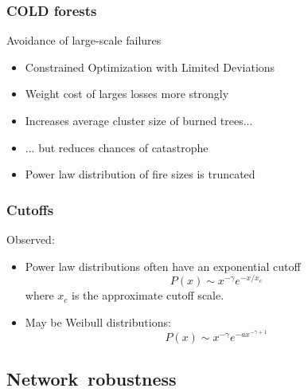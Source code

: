 \begin{frame}
  \frametitle{COLD forests}

  \begin{block}{Avoidance of large-scale failures}
      \begin{itemize}
      \item<1-> Constrained Optimization with Limited Deviations\cite{newman2002f}
      \item<2-> Weight cost of larges losses more strongly
      \item<3-> Increases average cluster size of burned trees...
      \item<4-> ... but reduces chances of catastrophe
      \item<5-> Power law distribution of fire sizes is truncated
      \end{itemize}
  \end{block}
  
\end{frame}


\begin{frame}
  \frametitle{Cutoffs}

  \begin{block}{Observed:}
    \begin{itemize}
    \item<1->
      Power law distributions often have an exponential cutoff
      $$ 
      P(x) \sim x^{-\gamma} e^{-x/x_c}
      $$
      where $x_c$ is the approximate cutoff scale.
    \item<2->
      May be Weibull distributions:
      $$ 
      P(x) \sim x^{-\gamma} e^{-a x^{-\gamma+1}}
      $$
    \end{itemize}
  \end{block}

\end{frame}

\subsection{Network\ robustness}

